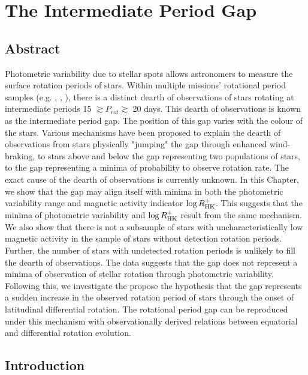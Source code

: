 
\newcommand\rper{$R_{\rm{per}}$}
\newcommand\teff{$T_{\rm{eff}}$}
\newcommand\logg{$\log g$}


\chapter{The Intermediate Period Gap}
\label{chap:period_gap}

\section*{Abstract}


Photometric variability due to stellar spots allows astronomers to measure the surface rotation periods of stars.
Within multiple missions' rotational period samples (e.g. \kepler, \ktoo, \ZTF), there is a distinct dearth of observations of stars rotating at intermediate periods 15 $\gtrsim P_{rot} \gtrsim$ 20 days.
This dearth of observations is known as the intermediate period gap.
The position of this gap varies with the colour of the stars.
Various mechanisms have been proposed to explain the dearth of observations from stars physically "jumping" the gap through enhanced wind-braking, to stars above and below the gap representing two populations of stars, to the gap representing a minima of probability to observe rotation rate.
The exact cause of the dearth of observations is currently unknown.
In this Chapter, we show that the gap may align itself with minima in both the photometric variability range and magnetic activity indicator $\log R^{+}_{\rm{HK}}$.
This suggests that the minima of photometric variability and $\log R^{+}_{\rm{HK}}$ result from the same mechanism.
We also show that there is not a subsample of stars with uncharacteristically low magnetic activity in the sample of stars without detection rotation periods.
Further, the number of stars with undetected rotation periods is unlikely to fill the dearth of observations.
The data suggests that the gap does not represent a minima of observation of stellar rotation through photometric variability.
Following this, we investigate the propose the hypothesis that the gap represents a sudden increase in the observed rotation period of stars through the onset of latitudinal differential rotation.
The rotational period gap can be reproduced under this mechanism with observationally derived relations between equatorial and differential rotation evolution.

\newpage

\section{Introduction}
\label{sec:intro}

